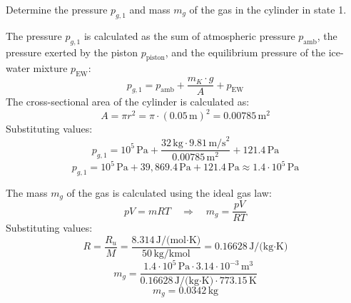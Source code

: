 Determine the pressure \( p_{g,1} \) and mass \( m_g \) of the gas in the cylinder in state 1.

The pressure \( p_{g,1} \) is calculated as the sum of atmospheric pressure \( p_{\text{amb}} \), the pressure exerted by the piston \( p_{\text{piston}} \), and the equilibrium pressure of the ice-water mixture \( p_{\text{EW}} \):  
\[
p_{g,1} = p_{\text{amb}} + \frac{m_K \cdot g}{A} + p_{\text{EW}}
\]  
The cross-sectional area of the cylinder is calculated as:  
\[
A = \pi r^2 = \pi \cdot (0.05 \, \text{m})^2 = 0.00785 \, \text{m}^2
\]  
Substituting values:  
\[
p_{g,1} = 10^5 \, \text{Pa} + \frac{32 \, \text{kg} \cdot 9.81 \, \text{m/s}^2}{0.00785 \, \text{m}^2} + 121.4 \, \text{Pa}
\]  
\[
p_{g,1} = 10^5 \, \text{Pa} + 39,869.4 \, \text{Pa} + 121.4 \, \text{Pa} \approx 1.4 \cdot 10^5 \, \text{Pa}
\]  

The mass \( m_g \) of the gas is calculated using the ideal gas law:  
\[
p V = m R T \quad \Rightarrow \quad m_g = \frac{p V}{R T}
\]  
Substituting values:  
\[
R = \frac{R_u}{M} = \frac{8.314 \, \text{J/(mol·K)}}{50 \, \text{kg/kmol}} = 0.16628 \, \text{J/(kg·K)}
\]  
\[
m_g = \frac{1.4 \cdot 10^5 \, \text{Pa} \cdot 3.14 \cdot 10^{-3} \, \text{m}^3}{0.16628 \, \text{J/(kg·K)} \cdot 773.15 \, \text{K}}
\]  
\[
m_g = 0.0342 \, \text{kg}
\]